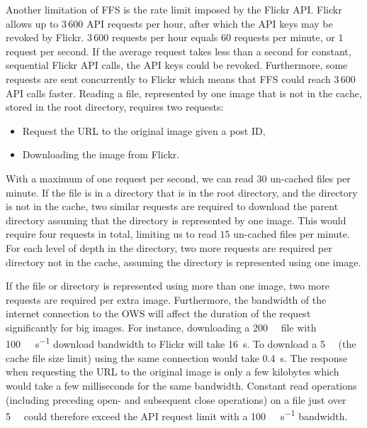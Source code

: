 Another limitation of \gls{FFS} is the rate limit imposed by the Flickr \gls{API}. Flickr allows up to $3\,600$ \gls{API} requests per hour, after which the \gls{API} keys may be revoked by Flickr. $3\,600$ requests per hour equals $60$ requests per minute, or $1$ request per second. If the average request takes less than a second for constant, sequential Flickr \gls{API} calls, the \gls{API} keys could be revoked. Furthermore, some requests are sent concurrently to Flickr which means that \gls{FFS} could reach $3\,600$ \gls{API} calls faster. Reading a file, represented by one image that is not in the cache, stored in the root directory, requires two requests:
\begin{itemize}
	\item Request the URL to the original image given a post ID,
	\item Downloading the image from Flickr. 
\end{itemize}
With a maximum of one request per second, we can read $30$ un-cached files per minute. If the file is in a directory that is in the root directory, and the directory is not in the cache, two similar requests are required to download the parent directory assuming that the directory is represented by one image. This would require four requests in total, limiting us to read $15$ un-cached files per minute. For each level of depth in the directory, two more requests are required per directory not in the cache, assuming the directory is represented using one image. 

If the file or directory is represented using more than one image, two more requests are required per extra image. Furthermore, the bandwidth of the internet connection to the \gls{OWS} will affect the duration of the request significantly for big images. For instance, downloading a \SI[per-mode = symbol]{200}{\mega\byte} file with \SI[per-mode = symbol]{100}{\mega\bit\per\second} download bandwidth to Flickr will take \SI[per-mode = symbol]{16}{\second}. To download a \SI[per-mode = symbol]{5}{\mega\byte} (the cache file size limit) using the same connection would take \SI[per-mode = symbol]{0.4}{\second}. The response when requesting the URL to the original image is only a few kilobytes which would take a few milliseconds for the same bandwidth. Constant read operations (including preceding open- and subsequent close operations) on a file just over \SI[per-mode = symbol]{5}{\mega\byte} could therefore exceed the \gls{API} request limit with a \SI[per-mode = symbol]{100}{\mega\bit\per\second} bandwidth.

